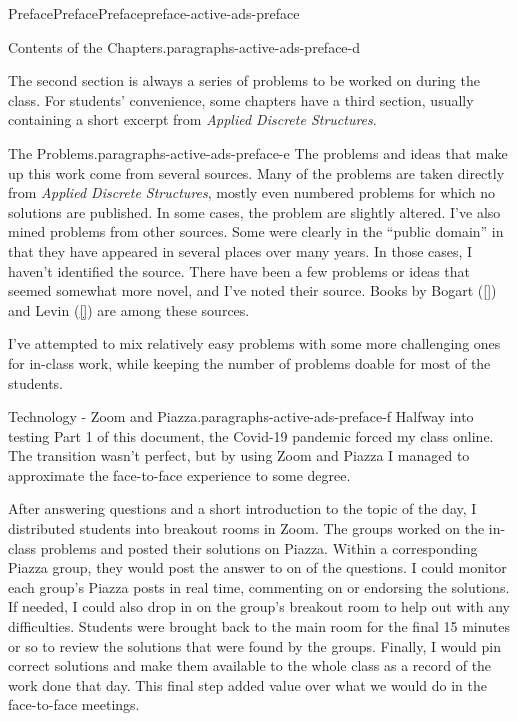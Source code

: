 \documentclass[oneside,10pt,]{book}
\newcommand{\xreffont}{\relax}
\numberwithin{equation}{section}
\begin{document}
\begin{preface}{Preface}{Preface}{}{Preface}{}{}{preface-active-ads-preface}
\begin{paragraphs}{Contents of the Chapters.}{paragraphs-active-ads-preface-d}
\par
The second section is always a series of problems to be worked on during the class. For students' convenience, some chapters have a third section, usually containing a short excerpt from \emph{Applied Discrete Structures}.%
\end{paragraphs}%
\begin{paragraphs}{The Problems.}{paragraphs-active-ads-preface-e}%
The problems and ideas that make up this work come from several sources.  Many of the problems are taken directly from \emph{Applied Discrete Structures}, mostly even numbered problems for which no solutions are published. In some cases, the problem are slightly altered.  I've also mined problems from other sources.  Some were clearly in the ``public domain'' in that they have appeared in several places over many years.  In those cases, I haven't identified the source.   There have been a few problems or ideas that seemed somewhat more novel, and I've noted their source. Books by Bogart (\hyperlink{biblio-biblio-bogart-2017}{[{\xreffont 1}]}) and Levin (\hyperlink{biblio-biblio-levin-2020}{[{\xreffont 3}]}) are among these sources.%
\par
I've attempted to mix relatively easy problems with some more challenging ones for in-class work, while keeping the number of problems doable for most of the students.%
\end{paragraphs}%
\begin{paragraphs}{Technology - Zoom and Piazza.}{paragraphs-active-ads-preface-f}%
Halfway into testing Part 1 of this document, the Covid-19 pandemic forced my class online. The transition wasn't perfect, but by using Zoom and Piazza I managed to approximate the face-to-face experience to some degree.%
\par
After answering questions and a short introduction to the topic of the day, I distributed students into breakout rooms in Zoom.  The groups worked on the in-class problems and posted their solutions on Piazza.  Within a corresponding Piazza group, they would post the answer to on of the questions.  I could monitor each group's Piazza posts in real time, commenting on or endorsing the solutions.  If needed, I could also drop in on the group's breakout room to help out with any difficulties. Students were brought back to the main room for the final 15 minutes or so to review the solutions that were found by the groups.  Finally, I would pin correct solutions and make them available to the whole class as a record of the work done that day. This final step added value over what we would do in the face-to-face meetings.%

\end{paragraphs}
\end{preface}
\end{document}
